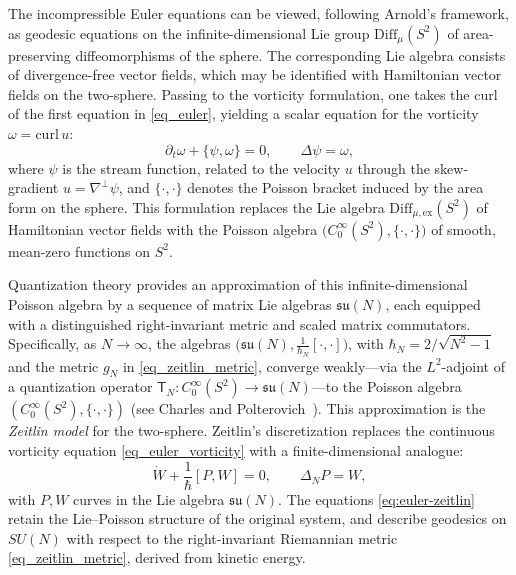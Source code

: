 \documentclass[11pt]{amsart}
\numberwithin{equation}{section}
\theoremstyle{definition}
\begin{document}
The incompressible Euler equations can be viewed, following Arnold’s framework, as geodesic equations on the infinite-dimensional Lie group $\mathrm{Diff}_\mu(S^2)$ of area-preserving diffeomorphisms of the sphere. The corresponding Lie algebra consists of divergence-free vector fields, which may be identified with Hamiltonian vector fields on the two-sphere. Passing to the vorticity formulation, one takes the curl of the first equation in \eqref{eq_euler}, yielding a scalar equation for the vorticity $\omega = \mathrm{curl}\, u$:
\begin{equation}\label{eq_euler_vorticity}
    \partial_t\omega + \{\psi, \omega\} = 0, \qquad \Delta \psi = \omega,
\end{equation}
where $\psi$ is the stream function, related to the velocity $u$ through the skew-gradient $u = \nabla^\perp\psi$, and $\{\cdot, \cdot\}$ denotes the Poisson bracket induced by the area form on the sphere. This formulation replaces the Lie algebra  $\mathrm{Diff}_{\mu, \mathrm{ex}}(S^2)$ of Hamiltonian vector fields with the Poisson algebra $\big(C^\infty_0(S^2), \{\cdot, \cdot\}\big)$ of smooth, mean-zero functions on $S^2$.

Quantization theory provides an approximation of this infinite-dimensional Poisson algebra by a sequence of matrix Lie algebras $\mathfrak{su}(N)$, each equipped with a distinguished right-invariant metric and scaled matrix commutators. Specifically, as $N \to \infty$, the algebras $\big(\mathfrak{su}(N), \frac{1}{\hbar_N}[\cdot,\cdot]\big)$, with $\hbar_N = 2/\sqrt{N^2 - 1}$ and the metric $g_N$ in \eqref{eq_zeitlin_metric}, converge weakly—via the $L^2$-adjoint of a quantization operator \( \mathsf{T}_N \colon C^\infty_0(S^2) \to \mathfrak{su}(N) \)—to the Poisson algebra \( (C^\infty_0(S^2), \{\cdot, \cdot\}) \) (see Charles and Polterovich~\cite{ChPo2018}). 
This approximation is the \emph{Zeitlin model} for the two-sphere. Zeitlin's discretization replaces the continuous vorticity equation \eqref{eq_euler_vorticity} with a finite-dimensional analogue:
\begin{equation}\label{eq:euler-zeitlin}
    \dot{W} + \frac{1}{\hbar}[P, W] = 0, \qquad \Delta_N P = W,
\end{equation}
with $P, W$ curves in the Lie algebra $\mathfrak{su}(N)$. The equations \eqref{eq:euler-zeitlin} retain the Lie–Poisson structure of the original system, and describe geodesics on \( SU(N) \) with respect to the right-invariant Riemannian metric \eqref{eq_zeitlin_metric}, derived from kinetic energy. 
\end{document}
